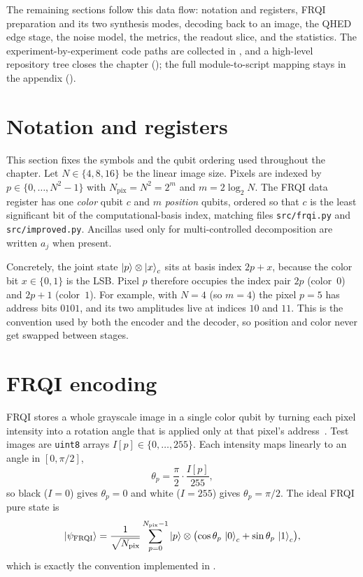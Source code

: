 The remaining sections follow this data flow: notation and registers, FRQI preparation and its two synthesis modes, decoding back to an image, the QHED edge stage, the noise model, the metrics, the readout slice, and the statistics. The experiment-by-experiment code paths are collected in , and a high-level repository tree closes the chapter (); the full module-to-script mapping stays in the appendix ().

\section{Notation and registers}
This section fixes the symbols and the qubit ordering used throughout the chapter. Let $N\in\{4,8,16\}$ be the linear image size. Pixels are indexed by $p\in\{0,\ldots,N^2-1\}$ with $N_{\mathrm{pix}}=N^2=2^m$ and $m=2\log_2 N$. The FRQI data register has one \emph{color} qubit $c$ and $m$ \emph{position} qubits, ordered so that $c$ is the least significant bit of the computational-basis index, matching files \texttt{src/frqi.py} and \texttt{src/improved.py}. Ancillas used only for multi-controlled decomposition are written $a_j$ when present.

Concretely, the joint state $\ket{p}\otimes\ket{x}_c$ sits at basis index $2p+x$, because the color bit $x\in\{0,1\}$ is the LSB. Pixel $p$ therefore occupies the index pair $2p$ (color~$0$) and $2p+1$ (color~$1$). For example, with $N=4$ (so $m=4$) the pixel $p=5$ has address bits $0101$, and its two amplitudes live at indices $10$ and $11$. This is the convention used by both the encoder and the decoder, so position and color never get swapped between stages.

\section{FRQI encoding}
FRQI stores a whole grayscale image in a single color qubit by turning each pixel intensity into a rotation angle that is applied only at that pixel's address~\cite{Le2011FRQI}. Test images are \texttt{uint8} arrays $I[p]\in\{0,\ldots,255\}$. Each intensity maps linearly to an angle in $[0,\pi/2]$,
\begin{equation}
\theta_p = \frac{\pi}{2}\cdot\frac{I[p]}{255},
\label{eq:frqi-angle}
\end{equation}
so black ($I=0$) gives $\theta_p=0$ and white ($I=255$) gives $\theta_p=\pi/2$. The ideal FRQI pure state is
\begin{equation}
\ket{\psi_{\mathrm{FRQI}}} = \frac{1}{\sqrt{N_{\mathrm{pix}}}}\sum_{p=0}^{N_{\mathrm{pix}}-1} \ket{p}\otimes\bigl(\cos\theta_p\,\ket{0}_c + \sin\theta_p\,\ket{1}_c\bigr),
\label{eq:frqi-state}
\end{equation}
which is exactly the convention implemented in .

